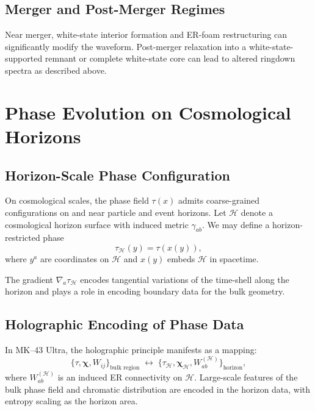 \section{Merger and Post-Merger Regimes}

Near merger, white-state interior formation and ER-foam restructuring can significantly modify the waveform.
Post-merger relaxation into a white-state-supported remnant or complete white-state core can lead to altered ringdown spectra as described above.


\chapter{Phase Evolution on Cosmological Horizons}

\section{Horizon-Scale Phase Configuration}

On cosmological scales, the phase field $\tau(x)$ admits coarse-grained configurations on and near particle and event horizons.
Let $\mathcal{H}$ denote a cosmological horizon surface with induced metric $\gamma_{ab}$.
We may define a horizon-restricted phase
\[
  \tau_{\mathcal{H}}(y) = \tau(x(y)),
\]
where $y^a$ are coordinates on $\mathcal{H}$ and $x(y)$ embeds $\mathcal{H}$ in spacetime.

The gradient $\nabla_a \tau_{\mathcal{H}}$ encodes tangential variations of the time-shell along the horizon and plays a role in encoding boundary data for the bulk geometry.

\section{Holographic Encoding of Phase Data}

In MK--43 Ultra, the holographic principle manifests as a mapping:
\[
  \{\tau,\bm{\chi},W_{ij}\}_{\text{bulk region}} \;\longleftrightarrow\;
  \{\tau_{\mathcal{H}},\bm{\chi}_{\mathcal{H}},W_{ab}^{(\mathcal{H})}\}_{\text{horizon}},
\]
where $W_{ab}^{(\mathcal{H})}$ is an induced ER connectivity on $\mathcal{H}$.
Large-scale features of the bulk phase field and chromatic distribution are encoded in the horizon data, with entropy scaling as the horizon area.

